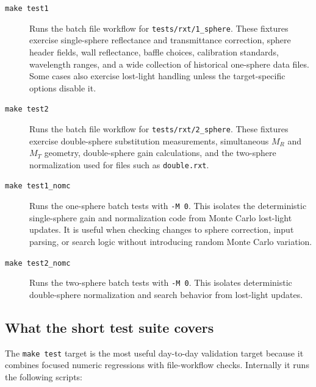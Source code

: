 \documentclass{article}
\begin{document}
\begin{description}
\item[\texttt{make test1}]
Runs the batch file workflow for \texttt{tests/rxt/1\_sphere}.  These fixtures
exercise single-sphere reflectance and transmittance correction, sphere header
fields, wall reflectance, baffle choices, calibration standards, wavelength
ranges, and a wide collection of historical one-sphere data files.  Some cases
also exercise lost-light handling unless the target-specific options disable it.

\item[\texttt{make test2}]
Runs the batch file workflow for \texttt{tests/rxt/2\_sphere}.  These fixtures
exercise double-sphere substitution measurements, simultaneous $M_R$ and $M_T$
geometry, double-sphere gain calculations, and the two-sphere normalization used
for files such as \texttt{double.rxt}.

\item[\texttt{make test1\_nomc}]
Runs the one-sphere batch tests with \texttt{-M 0}.  This isolates the
deterministic single-sphere gain and normalization code from Monte Carlo
lost-light updates.  It is useful when checking changes to sphere correction,
input parsing, or search logic without introducing random Monte Carlo variation.

\item[\texttt{make test2\_nomc}]
Runs the two-sphere batch tests with \texttt{-M 0}.  This isolates deterministic
double-sphere normalization and search behavior from lost-light updates.
\end{description}

\subsection{What the short test suite covers}

The \texttt{make test} target is the most useful day-to-day validation target
because it combines focused numeric regressions with file-workflow checks.
Internally it runs the following scripts:
\end{document}
